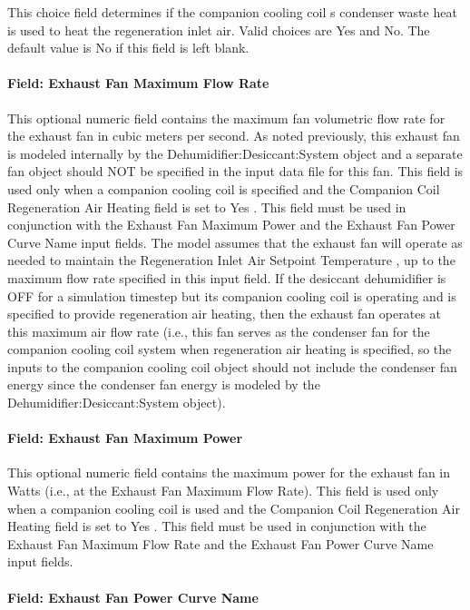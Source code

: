 This choice field determines if the companion cooling coil s condenser waste heat is used to heat the regeneration inlet air. Valid choices are Yes and No. The default value is No if this field is left blank.

\paragraph{Field: Exhaust Fan Maximum Flow Rate}\label{field-exhaust-fan-maximum-flow-rate}

This optional numeric field contains the maximum fan volumetric flow rate for the exhaust fan in cubic meters per second. As noted previously, this exhaust fan is modeled internally by the Dehumidifier:Desiccant:System object and a separate fan object should NOT be specified in the input data file for this fan. This field is used only when a companion cooling coil is specified and the Companion Coil Regeneration Air Heating field is set to Yes . This field must be used in conjunction with the Exhaust Fan Maximum Power and the Exhaust Fan Power Curve Name input fields. The model assumes that the exhaust fan will operate as needed to maintain the Regeneration Inlet Air Setpoint Temperature , up to the maximum flow rate specified in this input field. If the desiccant dehumidifier is OFF for a simulation timestep but its companion cooling coil is operating and is specified to provide regeneration air heating, then the exhaust fan operates at this maximum air flow rate (i.e., this fan serves as the condenser fan for the companion cooling coil system when regeneration air heating is specified, so the inputs to the companion cooling coil object should not include the condenser fan energy since the condenser fan energy is modeled by the Dehumidifier:Desiccant:System object).

\paragraph{Field: Exhaust Fan Maximum Power}\label{field-exhaust-fan-maximum-power}

This optional numeric field contains the maximum power for the exhaust fan in Watts (i.e., at the Exhaust Fan Maximum Flow Rate). This field is used only when a companion cooling coil is used and the Companion Coil Regeneration Air Heating field is set to Yes . This field must be used in conjunction with the Exhaust Fan Maximum Flow Rate and the Exhaust Fan Power Curve Name input fields.

\paragraph{Field: Exhaust Fan Power Curve Name}\label{field-exhaust-fan-power-curve-name}

